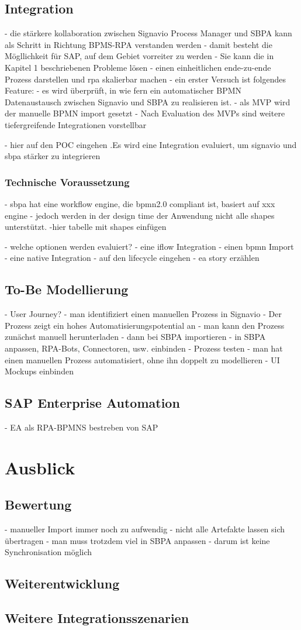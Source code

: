    \section{Integration}
   - die stärkere kollaboration zwischen Signavio Process Manager und SBPA kann als Schritt in Richtung BPMS-RPA verstanden werden
   - damit besteht die Mögllichkeit für SAP, auf dem Gebiet vorreiter zu werden
   - Sie kann die in Kapitel 1 beschriebenen Probleme lösen
   - einen einheitlichen ende-zu-ende Prozess darstellen und rpa skalierbar machen
   - ein erster Versuch ist folgendes Feature:
   - es wird überprüft, in wie fern ein automatischer BPMN Datenaustausch zwischen Signavio und SBPA zu realisieren ist.
   - als MVP wird der manuelle BPMN import gesetzt
   - Nach Evaluation des MVPs sind weitere tiefergreifende Integrationen vorstellbar

   - hier auf den POC eingehen
    .Es wird eine Integration evaluiert, um signavio und sbpa stärker zu integrieren
\subsection{Technische Voraussetzung}
- sbpa hat eine workflow engine, die bpmn2.0 compliant ist, basiert auf xxx engine
- jedoch werden in der design time der Anwendung nicht alle shapes unterstützt.
-hier tabelle mit shapes einfügen

   - welche optionen werden evaluiert?
    - eine iflow Integration
    - einen bpmn Import
    - eine native Integration
    - auf den lifecycle eingehen
    - ea story erzählen
    
    \section{To-Be Modellierung}
    - User Journey?
    - man identifiziert einen manuellen Prozess in Signavio
    - Der Prozess zeigt ein hohes Automatisierungspotential an
    - man kann den Prozess zunächst manuell herunterladen
    - dann bei SBPA importieren
    - in SBPA anpassen, RPA-Bots, Connectoren, usw. einbinden
    - Prozess testen
    - man hat einen manuellen Prozess automatisiert, ohne ihn doppelt zu modellieren
    - UI Mockups einbinden
    \section[short]{SAP Enterprise Automation}
    - EA als RPA-BPMNS bestreben von SAP
\chapter{Ausblick}
    \section{Bewertung}
    - manueller Import immer noch zu aufwendig
    - nicht alle Artefakte lassen sich übertragen
        - man muss trotzdem viel in SBPA anpassen
        - darum ist keine Synchronisation möglich
    \section{Weiterentwicklung}
    \section{Weitere Integrationsszenarien}